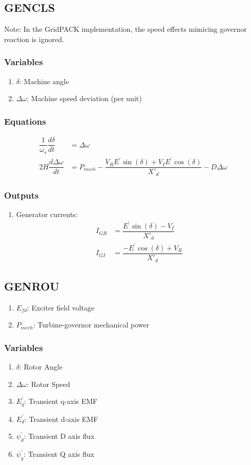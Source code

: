 \documentclass[12pt]{article}
\newcommand{\dw}{\Delta\omega}
\newcommand{\Xdp}{X{'}_d}
\newcommand{\Ep}{E^{'}}
\newcommand{\Pm}{P_{mech}}
\newcommand{\Efd}{E_{fd}}
\begin{document}
\subsection{GENCLS\cite{GENCLS}}
Note: In the GridPACK implementation, the speed effects mimicing governor reaction is ignored.

\subsubsection{Variables}
\begin{enumerate}
  \item $\delta$: Machine angle
  \item $\dw$: Machine speed deviation (per unit)
\end{enumerate}

\subsubsection{Equations}
\begin{align}
\dfrac{1}{\omega_s}\dfrac{d\delta}{dt} &= \dw \\
2H\dfrac{d\dw}{dt} &= \Pm - \dfrac{V_R\Ep\sin(\delta) + V_I\Ep\cos(\delta)}{\Xdp} - D\dw
\end{align}

\subsubsection{Outputs}
\begin{enumerate}
	\item Generator currents:
\begin{align}
  I_{GR} &= \dfrac{\Ep\sin(\delta) - V_I}{\Xdp} \\
  I_{GI} &= \dfrac{-\Ep\cos(\delta) + V_R}{\Xdp}
\end{align}
\end{enumerate}

\subsection{GENROU}

\begin{enumerate}
	\item $\Efd$: Exciter field voltage
	\item $\Pm$: Turbine-governor mechanical power
\end{enumerate}

\subsubsection{Variables}
\begin{enumerate}
  \item ${\delta}$: Rotor Angle
  \item ${\dw}$: Rotor Speed 
  \item $E^{'}_q$: Transient q-axis EMF
  \item $E^{'}_d$: Transient d-axis EMF
  \item $\psi^{'}_d$: Transient D axis flux
  \item $\psi^{'}_q$: Transient Q axis flux 
\end{enumerate}
\end{document}
